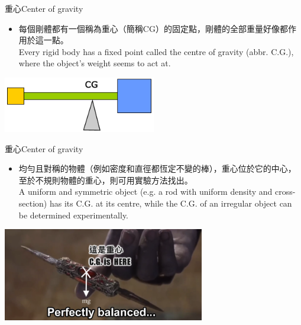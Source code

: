 \documentclass[beamer=true]{standalone}
\begin{document}
\begin{frame}{重心Center of gravity}
    \begin{itemize}
        \item 每個剛體都有一個稱為重心（簡稱CG）的固定點，剛體的全部重量好像都作用於這一點。\\Every rigid body has a fixed point called the centre of gravity (abbr. C.G.), where the object's weight seems to act at.
    \end{itemize}\bigskip
    {\par\centering
        \includegraphics[width=0.5\textwidth]{assets/ad409000.png}
        \par}
\end{frame}
\begin{frame}{重心Center of gravity}
    \begin{itemize}
        \item 均勻且對稱的物體（例如密度和直徑都恆定不變的棒），重心位於它的中心，至於不規則物體的重心，則可用實驗方法找出。\\A uniform and symmetric object (e.g. a rod with uniform density and cross-section) has its C.G. at its centre, while the C.G. of an irregular object can be determined experimentally.
    \end{itemize}\bigskip
    {\par\centering
        \includegraphics[width=0.66\textwidth]{assets/0610c65e.png}
        \par}
\end{frame}
\end{document}
